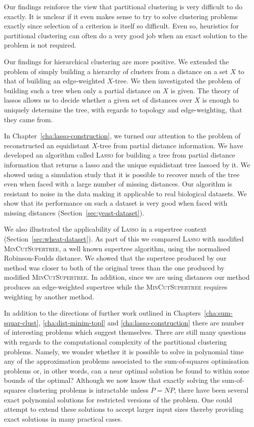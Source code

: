 Our findings reinforce the view that partitional clustering is very difficult
to do exactly.  It is unclear if it even makes sense to try to solve
clustering problems exactly since selection of a criterion is itself so
difficult.  Even so, heuristics for partitional clustering can often do a very
good job when an exact solution to the problem is not required.

Our findings for hierarchical clustering are more positive.  We extended the
problem of simply building a hierarchy of clusters from a distance on a set
$X$ to that of building an edge-weighted $X$-tree.  We then investigated the
problem of building such a tree when only a partial distance on $X$ is given.
The theory of lassos allows us to decide whether a given set of distances over
$X$ is enough to uniquely determine the tree, with regards to topology and
edge-weighting, that they came from.

In Chapter~\ref{cha:lasso-construction}, we turned our attention to the
problem of reconstructed an equidistant $X$-tree from partial distance
information.  We have developed an algorithm called \textsc{Lasso} for
building a tree from partial distance information that returns a lasso and the
unique equidistant tree lassoed by it.  We showed using a simulation study
that it is possible to recover much of the tree even when faced with a large
number of missing distances.  Our algorithm is resistant to noise in the data
making it applicable to real biological datasets.  We show that its
performance on such a dataset is very good when faced with missing distances
(Section~\ref{sec:yeast-dataset}).

We also illustrated the applicability of \textsc{Lasso} in a supertree context
(Section~\ref{sec:wheat-dataset}).  As part of this we compared \textsc{Lasso}
with modified \textsc{MinCutSupertree}, a well known supertree algorithm,
using the normalised Robinson-Foulds distance.  We showed that the supertree
produced by our method was closer to both of the original trees than the one
produced by modified \textsc{MinCutSupertree}.  In addition, since we are
using distances our method produces an edge-weighted supertree while the
\textsc{MinCutSupertree} requires weighting by another method.

In addition to the directions of further work outlined in
Chapters~\ref{cha:sum-squar-clust}, \ref{cha:dist-minim-topl} and
\ref{cha:lasso-construction} there are number of interesting problems which
suggest themselves.  There are still many questions with regards to the
computational complexity of the partitional clustering problems.  Namely, we
wonder whether it is possible to solve in polynomial time any of the
approximation problems associated to the sum-of-squares optimisation problems
or, in other words, can a near optimal solution be found to within some bounds
of the optimal?  Although we now know that exactly solving the sum-of-squares
clustering problems is intractable unless $P=NP$, there have been several
exact polynomial solutions for restricted versions of the problem.  One could
attempt to extend these solutions to accept larger input sizes thereby
providing exact solutions in many practical cases.

